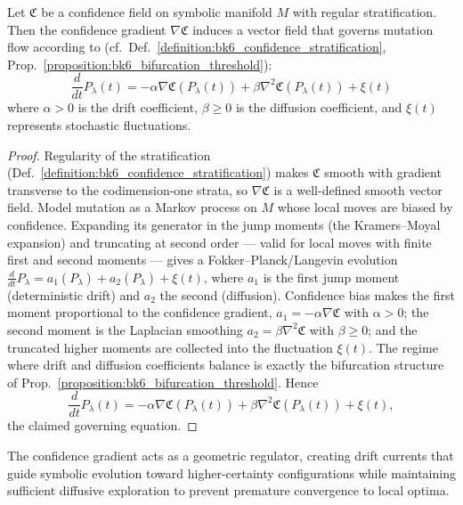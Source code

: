 \begin{proposition}
\label{proposition:bk6_confidence_gradient}
Let $\mathfrak{C}$ be a confidence field on symbolic manifold $M$ with regular stratification. Then the confidence gradient $\nabla \mathfrak{C}$ induces a vector field that governs mutation flow according to (cf.~Def.~\ref{definition:bk6_confidence_stratification}, Prop.~\ref{proposition:bk6_bifurcation_threshold}):
\begin{equation}
\frac{d}{dt} P_\lambda(t) = -\alpha \nabla \mathfrak{C}(P_\lambda(t)) + \beta \nabla^2 \mathfrak{C}(P_\lambda(t)) + \xi(t)
\end{equation}
where $\alpha > 0$ is the drift coefficient, $\beta \geq 0$ is the diffusion coefficient, and $\xi(t)$ represents stochastic fluctuations.
\end{proposition}
\begin{proof}
\label{proof:bk6_confidence_gradient}
\leavevmode
Regularity of the stratification (Def.~\ref{definition:bk6_confidence_stratification}) makes $\mathfrak{C}$ smooth with gradient transverse to the codimension-one strata, so $\nabla\mathfrak{C}$ is a well-defined smooth vector field. Model mutation as a Markov process on $M$ whose local moves are biased by confidence. Expanding its generator in the jump moments (the Kramers--Moyal expansion) and truncating at second order --- valid for local moves with finite first and second moments --- gives a Fokker--Planck/Langevin evolution $\tfrac{d}{dt}P_\lambda=a_1(P_\lambda)+a_2(P_\lambda)+\xi(t)$, where $a_1$ is the first jump moment (deterministic drift) and $a_2$ the second (diffusion). Confidence bias makes the first moment proportional to the confidence gradient, $a_1=-\alpha\nabla\mathfrak{C}$ with $\alpha>0$; the second moment is the Laplacian smoothing $a_2=\beta\nabla^2\mathfrak{C}$ with $\beta\ge 0$; and the truncated higher moments are collected into the fluctuation $\xi(t)$. The regime where drift and diffusion coefficients balance is exactly the bifurcation structure of Prop.~\ref{proposition:bk6_bifurcation_threshold}. Hence
\[
\frac{d}{dt}P_\lambda(t)=-\alpha\nabla\mathfrak{C}(P_\lambda(t))+\beta\nabla^2\mathfrak{C}(P_\lambda(t))+\xi(t),
\]
the claimed governing equation.
\end{proof}

The confidence gradient acts as a geometric regulator, creating drift currents that guide symbolic evolution toward higher-certainty configurations while maintaining sufficient diffusive exploration to prevent premature convergence to local optima.

